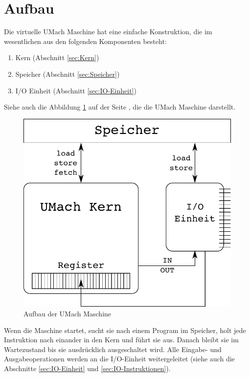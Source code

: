 \section{Aufbau}
\label{sec:Aufbau}

Die virtuelle UMach Maschine hat eine einfache Konstruktion, die im
wesentlichen aus den folgenden Komponenten besteht:
\begin{enumerate}
 \item Kern (Abschnitt \ref{sec:Kern})
 \item Speicher (Abschnitt \ref{sec:Speicher})
 \item I/O Einheit (Abschnitt \ref{sec:IO-Einheit})
\end{enumerate}

Siehe auch die Abbildung \ref{fig:umach-aufbau} auf der Seite
\pageref{fig:umach-aufbau}, die die UMach Maschine darstellt.

\begin{figure}[htp]
 \centering
 \includegraphics{./img/UMach-Aufbau.pdf}
 \caption{Aufbau der UMach Maschine}
 \label{fig:umach-aufbau}
\end{figure}

Wenn die Maschine startet, sucht sie nach einem Program im Speicher, holt jede
Instruktion nach einander in den Kern und führt sie aus. Danach bleibt sie im
Wartezustand bis sie ausdrücklich ausgeschaltet wird. Alle Eingabe- und
Ausgabeoperationen werden an die I/O-Einheit weitergeleitet (siehe auch die
Abschnitte \ref{sec:IO-Einheit} und \ref{sec:IO-Instruktionen}).




